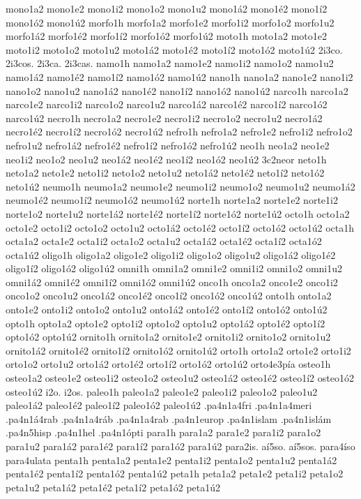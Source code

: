 {mono1a2 mono1e2 mono1i2 mono1o2 mono1u2
mono1á2 mono1é2 mono1í2 mono1ó2 mono1ú2
morfo1h
morfo1a2 morfo1e2 morfo1i2 morfo1o2 morfo1u2
morfo1á2 morfo1é2 morfo1í2 morfo1ó2 morfo1ú2
moto1h
moto1a2 moto1e2 moto1i2 moto1o2 moto1u2
moto1á2 moto1é2 moto1í2 moto1ó2 moto1ú2
2i3co.
2i3cos.
2i3ca.
2i3cas.
namo1h
namo1a2 namo1e2 namo1i2 namo1o2 namo1u2
namo1á2 namo1é2 namo1í2 namo1ó2 namo1ú2
nano1h
nano1a2 nano1e2 nano1i2 nano1o2 nano1u2
nano1á2 nano1é2 nano1í2 nano1ó2 nano1ú2
narco1h
narco1a2 narco1e2 narco1i2 narco1o2 narco1u2
narco1á2 narco1é2 narco1í2 narco1ó2 narco1ú2
necro1h
necro1a2 necro1e2 necro1i2 necro1o2 necro1u2
necro1á2 necro1é2 necro1í2 necro1ó2 necro1ú2
nefro1h
nefro1a2 nefro1e2 nefro1i2 nefro1o2 nefro1u2
nefro1á2 nefro1é2 nefro1í2 nefro1ó2 nefro1ú2
neo1h
neo1a2 neo1e2 neo1i2 neo1o2 neo1u2
neo1á2 neo1é2 neo1í2 neo1ó2 neo1ú2
3c2neor
neto1h
neto1a2 neto1e2 neto1i2 neto1o2 neto1u2
neto1á2 neto1é2 neto1í2 neto1ó2 neto1ú2
neumo1h
neumo1a2 neumo1e2 neumo1i2 neumo1o2 neumo1u2
neumo1á2 neumo1é2 neumo1í2 neumo1ó2 neumo1ú2
norte1h
norte1a2 norte1e2 norte1i2 norte1o2 norte1u2
norte1á2 norte1é2 norte1í2 norte1ó2 norte1ú2
octo1h
octo1a2 octo1e2 octo1i2 octo1o2 octo1u2
octo1á2 octo1é2 octo1í2 octo1ó2 octo1ú2
octa1h
octa1a2 octa1e2 octa1i2 octa1o2 octa1u2
octa1á2 octa1é2 octa1í2 octa1ó2 octa1ú2
oligo1h
oligo1a2 oligo1e2 oligo1i2 oligo1o2 oligo1u2
oligo1á2 oligo1é2 oligo1í2 oligo1ó2 oligo1ú2
omni1h
omni1a2 omni1e2 omni1i2 omni1o2 omni1u2
omni1á2 omni1é2 omni1í2 omni1ó2 omni1ú2
onco1h
onco1a2 onco1e2 onco1i2 onco1o2 onco1u2
onco1á2 onco1é2 onco1í2 onco1ó2 onco1ú2
onto1h
onto1a2 onto1e2 onto1i2 onto1o2 onto1u2
onto1á2 onto1é2 onto1í2 onto1ó2 onto1ú2
opto1h
opto1a2 opto1e2 opto1i2 opto1o2 opto1u2
opto1á2 opto1é2 opto1í2 opto1ó2 opto1ú2
ornito1h
ornito1a2 ornito1e2 ornito1i2 ornito1o2 ornito1u2
ornito1á2 ornito1é2 ornito1í2 ornito1ó2 ornito1ú2
orto1h
orto1a2 orto1e2 orto1i2 orto1o2 orto1u2
orto1á2 orto1é2 orto1í2 orto1ó2 orto1ú2
orto4e3pía
osteo1h
osteo1a2 osteo1e2 osteo1i2 osteo1o2 osteo1u2
osteo1á2 osteo1é2 osteo1í2 osteo1ó2 osteo1ú2
i2o.
i2os.
paleo1h
paleo1a2 paleo1e2 paleo1i2 paleo1o2 paleo1u2
paleo1á2 paleo1é2 paleo1í2 paleo1ó2 paleo1ú2
.pa4n1a4fri
.pa4n1a4meri
.pa4n1á4rab
.pa4n1a4ráb
.pa4n1a4rab
.pa4n1europ
.pa4n1islam
.pa4n1islám
.pa4n5hisp
.pa4n1hel
.pa4n1ópti
para1h
para1a2 para1e2 para1i2 para1o2 para1u2
para1á2 para1é2 para1í2 para1ó2 para1ú2
para2is.
aí5so.
aí5sos.
para4íso
para4ulata
penta1h
penta1a2 penta1e2 penta1i2 penta1o2 penta1u2
penta1á2 penta1é2 penta1í2 penta1ó2 penta1ú2
peta1h
peta1a2 peta1e2 peta1i2 peta1o2 peta1u2
peta1á2 peta1é2 peta1í2 peta1ó2 peta1ú2
}
